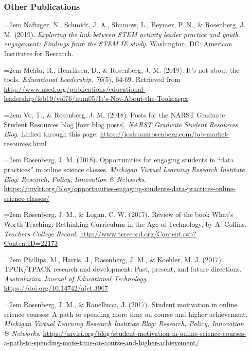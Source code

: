 \documentclass[14,]{article}
\begin{document}
\hypertarget{other-publications}{%
\subsubsection{Other Publications}\label{other-publications}}

\hangindent=2em Naftzger, N., Schmidt, J. A., Shumow, L., Beymer, P. N.,
\& Rosenberg, J. M. (2019). \emph{Exploring the link between STEM
activity leader practice and youth engagement: Findings from the STEM IE
study}. Washington, DC: American Institutes for Research.

\hangindent=2em Mehta, R., Henriksen, D., \& Rosenberg, J. M. (2019).
It's not about the tools. \emph{Educational Leadership, 76}(5), 64-69.
Retrieved from
\url{http://www.ascd.org/publications/educational-leadership/feb19/vol76/num05/It's-Not-About-the-Tools.aspx}

\hangindent=2em Vo, T., \& Rosenberg, J. M. (2018). Posts for the NARST
Graduate Student Resources blog {[}four blog posts{]}. \emph{NARST
Graduate Student Resources Blog}. Linked through this page:
\url{https://joshuamrosenberg.com/job-market-resources.html}

\hangindent=2em Rosenberg, J. M. (2018). Opportunities for engaging
students in ``data practices'' in online science classes. \emph{Michigan
Virtual Learning Research Institute Blog: Research, Policy, Innovation
\& Networks}.
\url{https://mvlri.org/blog/opportunities-engaging-students-data-practices-online-science-classes/}

\hangindent=2em Rosenberg, J. M., \& Logan, C. W. (2017). Review of the
book What's Worth Teaching: Rethinking Curriculum in the Age of
Technology, by A. Collins. \emph{Teachers College Record}.
\url{http://www.tcrecord.org/Content.asp?ContentID=22173}

\hangindent=2em Phillips, M., Harris, J., Rosenberg, J. M., \& Koehler,
M. J. (2017). TPCK/TPACK research and development: Past, present, and
future directions. \emph{Australasian Journal of Educational
Technology}. \url{https://doi.org/10.14742/ajet.3907}

\hangindent=2em Rosenberg, J. M., \& Ranellucci, J. (2017). Student
motivation in online science courses: A path to spending more time on
course and higher achievement. \emph{Michigan Virtual Learning Research
Institute Blog: Research, Policy, Innovation \& Networks}.
\url{https://mvlri.org/blog/student-motivation-in-online-science-courses-a-path-to-spending-more-time-on-course-and-higher-achievement/}
\end{document}
